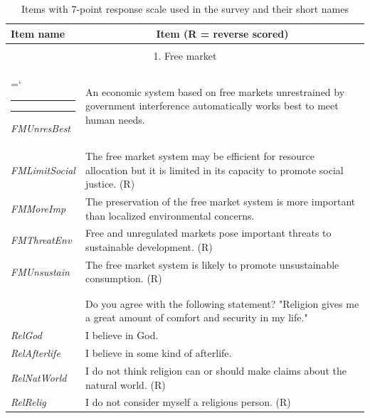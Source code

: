 \documentclass[fignum,man]{apa}\usepackage[]{graphicx}\usepackage[]{color}
\makeatletter
\def\nobreakhline{%
	\noalign{\ifnum0=`}\fi
	\penalty\@M
	\futurelet\@let@token\LT@@nobreakhline}
\def\LT@@nobreakhline{%
	\ifx\@let@token\hline
	\global\let\@gtempa\@gobble
	\gdef\LT@sep{\penalty\@M\vskip\doublerulesep}%
	\else
	\global\let\@gtempa\@empty
	\gdef\LT@sep{\penalty\@M\vskip-\arrayrulewidth}%
	\fi
	\ifnum0=`{\fi}%
	\multispan\LT@cols
	\unskip\leaders\hrule\@height\arrayrulewidth\hfill\cr
	\noalign{\LT@sep}%
	\multispan\LT@cols
	\unskip\leaders\hrule\@height\arrayrulewidth\hfill\cr
	\noalign{\penalty\@M}%
	\@gtempa}
\makeatother
\begin{document}
\pagebreak
\begin{longtable}{p{.2\linewidth} p{.8\linewidth}} %

	\caption[]{Items with 7-point response scale 
		used in the survey and their short names\label{tab:items}}\\*
	\hline
	Item name & \multicolumn{1}{c}{Item (R = reverse scored)}  \\*
	\hline

	\\*
\hline

\multicolumn{2}{c}{1. Free market}\\*
\nopagebreak
\nobreakhline
\nopagebreak
\emph{FMUnresBest}&An economic system based on free markets unrestrained by government interference automatically works best to meet human needs. \\*
\emph{FMLimitSocial} &The free market system may be efficient for resource allocation  but it is limited in its capacity to promote social justice. (R)  \\*
\emph{FMMoreImp}&The preservation of the free market system is more important than localized environmental concerns.  \\*
\emph{FMThreatEnv} &Free and unregulated markets pose important threats to sustainable development. (R)  \\*
\emph{FMUnsustain} &The free market system is likely to promote unsustainable consumption. (R) \\

	\\*
	\nobreakhline
	\multicolumn{2}{c}{2. Religiosity}\\*
	\nopagebreak
	\nobreakhline
	\nopagebreak
\emph{RelComf} & Do you agree with the following statement? "Religion gives me a great amount of comfort and security in my life."\\*
\emph{RelGod} & I believe in God.\\*
\emph{RelAfterlife} & I believe in some kind of afterlife.\\*
\emph{RelNatWorld} & I do not think religion can or should make claims about the natural world. (R)\\*
\emph{RelRelig} & I do not consider myself a religious person. (R)\\
	

\end{longtable}
\end{document}
